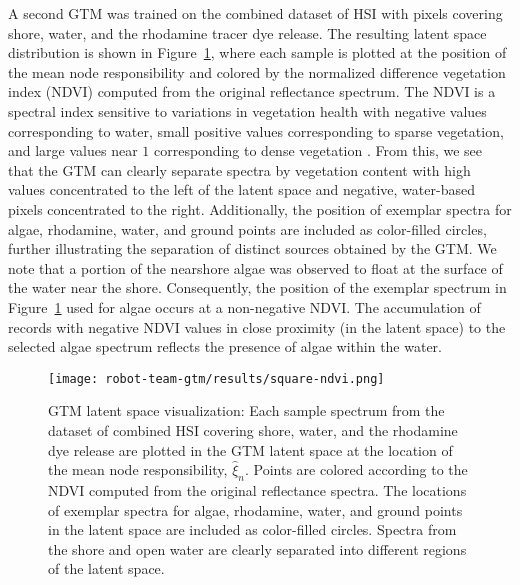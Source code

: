 A second GTM was trained on the combined dataset of HSI with pixels covering shore, water, and the rhodamine tracer dye release. The resulting latent space distribution is shown in Figure~\ref{fig:gtm-ndvi}, where each sample is plotted at the position of the mean node responsibility and colored by the normalized difference vegetation index (NDVI) computed from the original reflectance spectrum. The NDVI is a spectral index sensitive to variations in vegetation health with negative values corresponding to water, small positive values corresponding to sparse vegetation, and large values near $1$ corresponding to dense vegetation \cite{thenkabail2018hyperspectral}. From this, we see that the GTM can clearly separate spectra by vegetation content with high values concentrated to the left of the latent space and negative, water-based pixels concentrated to the right. Additionally, the position of exemplar spectra for algae, rhodamine, water, and ground points are included as color-filled circles, further illustrating the separation of distinct sources obtained by the GTM. We note that a portion of the nearshore algae was observed to float at the surface of the water near the shore. Consequently, the position of the exemplar spectrum in Figure~\ref{fig:gtm-ndvi} used for algae occurs at a non-negative NDVI. The accumulation of records with negative NDVI values in close proximity (in the latent space) to the selected algae spectrum reflects the presence of algae within the water.


\begin{figure}[H]
  \vspace{-0.25cm}
  \centering
  \texttt{[image: robot-team-gtm/results/square-ndvi.png]}
  \vspace{-0.75cm}
  \caption{GTM latent space visualization: Each sample spectrum from the dataset
    of combined HSI covering shore, water, and the rhodamine dye release are
    plotted in the GTM latent space at the location of the mean node
    responsibility, $\hat{\xi}_n$. Points are colored according to the NDVI
    computed from the original reflectance spectra. The locations of exemplar
    spectra for algae, rhodamine, water, and ground points in the latent space
    are included as color-filled circles. Spectra from the shore and open water
    are clearly separated into different regions of the latent
    space.}
  \label{fig:gtm-ndvi}
\end{figure}



